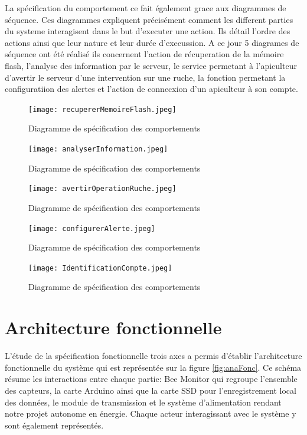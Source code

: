 La spécification du comportement ce fait également grace aux diagrammes de séquence. Ces diagrammes expliquent précisément comment les different parties du systeme interagisent dans le but d'executer une action. Ils détail l'ordre des actions ainsi que leur nature et leur durée d'execussion. A ce jour 5 diagrames de séquence ont été réalisé ils concernent l'action de récuperation de la mémoire flash, l'analyse des information par le serveur, le service permetant à l'apiculteur d'avertir le serveur d'une intervention sur une ruche, la fonction permetant la configuratiion des alertes et l'action de connecxion d'un apiculteur à son compte.
\begin{figure}[h!]
\centering\texttt{[image: recupererMemoireFlash.jpeg]}
\caption{\label{fig:sp_comp} Diagramme de spécification des comportements}
\end{figure}
\begin{figure}[h!]
\centering\texttt{[image: analyserInformation.jpeg]}
\caption{\label{fig:sp_comp} Diagramme de spécification des comportements}
\end{figure}
\begin{figure}[h!]
\centering\texttt{[image: avertirOperationRuche.jpeg]}
\caption{\label{fig:sp_comp} Diagramme de spécification des comportements}
\end{figure}
\begin{figure}[h!]
\centering\texttt{[image: configurerAlerte.jpeg]}
\caption{\label{fig:sp_comp} Diagramme de spécification des comportements}
\end{figure}
\begin{figure}[h!]
\centering\texttt{[image: IdentificationCompte.jpeg]}
\caption{\label{fig:sp_comp} Diagramme de spécification des comportements}
\end{figure}
\pagebreak

\chapter{Architecture fonctionnelle}

L'étude de la spécification fonctionnelle trois axes a permis d'établir l'architecture fonctionnelle du système qui est représentée sur la figure \ref{fig:anaFonc}.
Ce schéma résume les interactions entre chaque partie: Bee Monitor qui regroupe l'ensemble des capteurs, la carte Arduino ainsi que la carte SSD pour l'enregistrement local des données, le module de transmission et le système d'alimentation rendant notre projet autonome en énergie. Chaque acteur interagissant avec le système y sont également représentés. 
  

